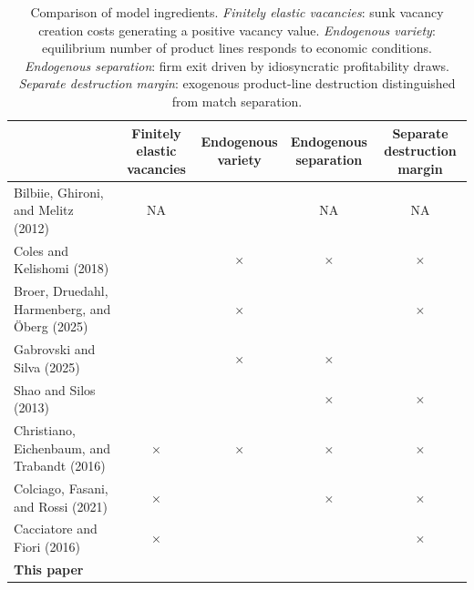 \documentclass[authoryear, review, 12pt]{elsarticle}
\begin{document}
	\begin{table}[H]
		\centering
		\footnotesize
		\setlength{\tabcolsep}{0.15cm}
		\begin{tabular}{l|cccc}
			\toprule
			& \makecell{Finitely elastic\\ vacancies} 
			& \makecell{Endogenous\\variety} 
			& \makecell{Endogenous\\separation} 
			& \makecell{Separate destruction\\margin} \\
			\midrule
			Bilbiie, Ghironi, and Melitz (2012) 
			& NA & \checkmark & NA & NA \\
			Coles and Kelishomi (2018) 
			& \checkmark & $\times$ & $\times$ & $\times$ \\
			Broer, Druedahl, Harmenberg, and \"{O}berg (2025) 
			& \checkmark & $\times$ & \checkmark & $\times$ \\
			Gabrovski and Silva (2025) 
			& \checkmark & $\times$ & $\times$ & \checkmark \\
			Shao and Silos (2013) 
			& \checkmark & \checkmark & $\times$ & $\times$ \\
			Christiano, Eichenbaum, and Trabandt (2016) 
			& $\times$ & $\times$ & $\times$ & $\times$ \\
			Colciago, Fasani, and Rossi (2021) 
			& $\times$ & \checkmark & $\times$ & $\times$ \\
			Cacciatore and Fiori (2016) 
			& $\times$ & \checkmark & \checkmark & $\times$ \\
			\textbf{This paper} 
			& \checkmark & \checkmark & \checkmark & \checkmark \\
			\bottomrule
		\end{tabular}
		\caption{Comparison of model ingredients. 
			\emph{Finitely elastic vacancies}: sunk vacancy creation 
			costs generating a positive vacancy value. 
			\emph{Endogenous variety}: equilibrium number of product 
			lines responds to economic conditions. 
			\emph{Endogenous separation}: firm exit driven by 
			idiosyncratic profitability draws. 
			\emph{Separate destruction margin}: exogenous product-line 
			destruction distinguished from match separation.}
		\label{tab:ingredients_comparison}
	\end{table}
	
\end{document}
